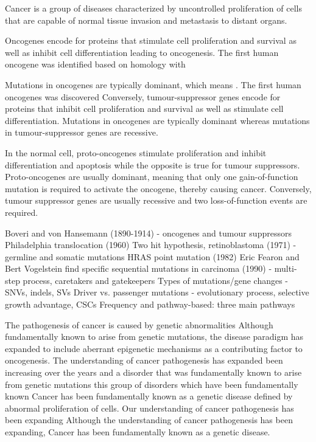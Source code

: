 Cancer is a group of diseases characterized by uncontrolled proliferation of cells that are capable of normal tissue invasion and metastasis to distant organs.

Oncogenes encode for proteins that stimulate cell proliferation and survival as well as inhibit cell differentiation leading to oncogenesis. The first human oncogene was identified based on homology with

Mutations in oncogenes are typically dominant, which means . The first human oncogenes was discovered Conversely, tumour-suppressor genes encode for proteins that inhibit cell proliferation and survival as well as stimulate cell differentiation. Mutations in oncogenes are typically dominant whereas mutations in tumour-suppressor genes are recessive.

In the normal cell, proto-oncogenes stimulate proliferation and inhibit differentiation and apoptosis while the opposite is true for tumour suppressors. Proto-oncogenes are usually dominant, meaning that only one gain-of-function mutation is required to activate the oncogene, thereby causing cancer. Conversely, tumour suppressor genes are usually recessive and two loss-of-function events are required.

Boveri and von Hansemann (1890-1914) - oncogenes and tumour suppressors
Philadelphia translocation (1960)
Two hit hypothesis, retinoblastoma (1971) - germline and somatic mutations
HRAS point mutation (1982)
Eric Fearon and Bert Vogelstein find specific sequential mutations in carcinoma (1990) - multi-step process, caretakers and gatekeepers
Types of mutations/gene changes - SNVs, indels, SVs
Driver vs. passenger mutations - evolutionary process, selective growth advantage, CSCs
Frequency and pathway-based: three main pathways

The pathogenesis of cancer is caused by genetic abnormalities
Although fundamentally known to arise from genetic mutations, the disease paradigm has expanded to include aberrant epigenetic mechanisms as a contributing factor to oncogenesis.
The understanding of cancer pathogenesis has expanded been increasing over the years and a disorder that was fundamentally known to arise from genetic mutations this group of disorders which have been fundamentally known Cancer has been fundamentally known as a genetic disease defined by abnormal proliferation of cells.
Our understanding of cancer pathogenesis has been expanding  Although the understanding of cancer pathogenesis has been expanding, Cancer has been fundamentally known as a genetic disease.

